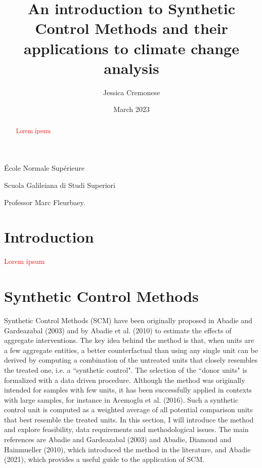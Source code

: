 \documentclass[12pt,a4paper,draft]{article}
\begin{document}
\begin{titlepage}
\title{An introduction to Synthetic Control Methods and their applications to climate change analysis}
\author{Jessica Cremonese}
\date{March 2023}
\maketitle

\vspace{2cm}

\begin{center}
    École Normale Supérieure
\end{center}

\begin{center}
    Scuola Galileiana di Studi Superiori
\end{center}

\vspace{5cm}
Professor Marc Fleurbaey.


\end{titlepage}

\tableofcontents

\newpage
\begin{abstract}
    \textcolor{red}{Lorem ipsum}
\end{abstract}
\newpage


\section{Introduction}
\textcolor{red}{Lorem ipsum}




\section{Synthetic Control Methods}
Synthetic Control Methods (SCM) have been originally proposed in Abadie and Gardeazabal 
(2003) and by Abadie et al. (2010) to estimate the effects of aggregate interventions.
The key idea behind the method is that, when units are a few aggregate entities, 
a better counterfactual than using any single unit can be derived by computing a 
combination of the untreated units that closely resembles the treated one, i.e. 
a ``synthetic control". The selection of the ``donor units" is formalized with a data
driven procedure.
Although the method was originally intended for samples with few units, it has been 
successfully applied in contexts with large samples, for instance in Acemoglu et 
al. (2016).
Such a synthetic control unit is computed as a weighted average of all potential 
comparison units that best resemble the treated units. In this section, I will 
introduce the method and explore feasibility, data requirements and methodological 
issues. 
The main references are Abadie and Gardeazabal (2003) and Abadie, Diamond and 
Hainmueller (2010), which introduced the method in the literature, and Abadie 
(2021), which provides a useful guide to the application of SCM.
\end{document}
